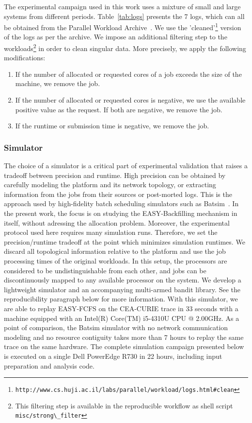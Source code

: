 \documentclass[sigconf]{acmart}
\begin{document}
The experimental campaign used in this work uses a mixture of small and large
systems from different periods. Table~\ref{tab:logs} presents the 7 logs, which
can all be obtained from the Parallel Workload
Archive~\cite{Feitelson20142967}. We use the 'cleaned'\footnote{\lstinline[basicstyle=\ttfamily\color{blue}]|http://www.cs.huji.ac.il/labs/parallel/workload/logs.html#clean|} version of the logs as
per the archive. We impose an additional
filtering step to the workloads\footnote{This filtering step is available in
the reproducible workflow\cite{repro} as shell script
\lstinline[basicstyle=\ttfamily\color{blue}]|misc/strong\_filter|} in order to
clean singular data. More precisely, we apply the following modifications:

\begin{enumerate}
  \item If the number of allocated or requested cores of a job  exceeds the size of the machine, we remove the job.
  \item If the number of allocated or requested cores is negative, we use the available positive value as the request. If both are negative, we remove the job.
  \item If the runtime or submission time is negative, we remove the job.
\end{enumerate}

\subsubsection{Simulator}

The choice of a simulator is a critical part of experimental validation that
raises a tradeoff between precision and runtime. High precision can be obtained
by carefully modeling the platform and its network topology, or extracting
information from the jobs from their sources or post-morted logs. This is the
approach used by high-fidelity batch scheduling simulators such as
Batsim~\cite{batsim}. In the present work, the focus is on studying the
EASY-Backfilling mechanism in itself, without adressing the allocation problem.
Moreover, the experimental protocol used here requires many simulation runs.
Therefore, we set the precision/runtime tradeoff at the point which minimizes
simulation runtimes. We discard all topological information relative to the
platform and use the job processing times of the original workloads. In this
setup, the processors are considered to be undistinguishable from each other,
and jobs can be discontinuously mapped to any available processor on the
system. We develop a lightweight simulator\cite{ocst} and an accompanying
multi-armed bandit library\cite{obandit}. See the reproducibility paragraph
below for more information.  With this simulator, we are able to replay
EASY-FCFS on the CEA-CURIE trace in 33 seconds with a machine equipped with an
Intel(R) Core(TM) i5-4310U CPU @ 2.00GHz. As a point of comparison, the Batsim
simulator with no network communication modeling and no resource contiguity
takes more than 7 hours to replay the same trace on the same hardware. The complete
simulation campaign presented below is executed on a single Dell PowerEdge R730 in 22
hours, including input preparation and analysis code.
\end{document}
